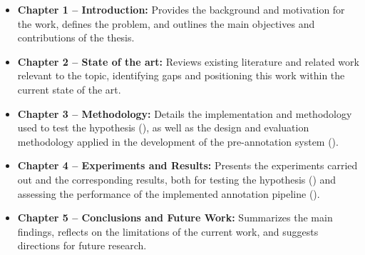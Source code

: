 \begin{itemize}
    \item \textbf{Chapter 1 – Introduction:} Provides the background and motivation for the work, defines the problem, and outlines the main objectives and contributions of the thesis.
    
    \item \textbf{Chapter 2 – State of the art:} Reviews existing literature and related work relevant to the topic, identifying gaps and positioning this work within the current state of the art.
    
    \item \textbf{Chapter 3 – Methodology:} Details the implementation and methodology used to test the hypothesis (), as well as the design and evaluation methodology applied in the development of the pre-annotation system ().

    \item \textbf{Chapter 4 – Experiments and Results:} Presents the experiments carried out and the corresponding results, both for testing the hypothesis () and assessing the performance of the implemented annotation pipeline ().

    \item \textbf{Chapter 5 – Conclusions and Future Work:} Summarizes the main findings, reflects on the limitations of the current work, and suggests directions for future research.
\end{itemize}
    

